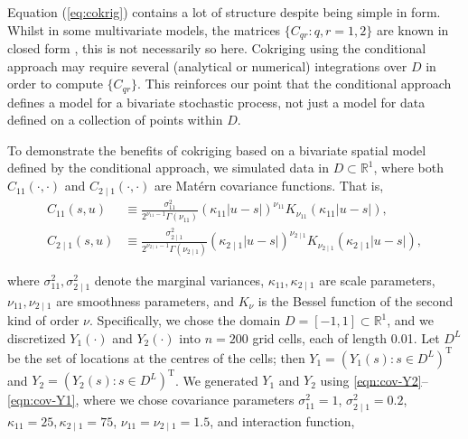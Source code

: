 \documentclass[lineno]{biometrika}
\def\T{{ \mathrm{\scriptscriptstyle T} }}
\newcommand{\Cmat} {C}
\newcommand{\svec} {s}
\newcommand{\h}{h}
\newcommand{\Yvec}{Y}
\begin{document}
Equation (\ref{eq:cokrig}) contains a lot of structure despite being simple in form. Whilst in some multivariate models, the matrices $\{\Cmat_{qr}: q,r = 1,2\}$ are known in closed form \citep{GentonKleiber2015}, this is not necessarily so here. Cokriging using the conditional approach may require several (analytical or numerical) integrations over $D$ in order to compute $\{\Cmat_{qr}\}$. This reinforces our point that the conditional approach defines a model for a bivariate stochastic process, not just a model for data defined on a collection of points within $D$. 

To demonstrate the benefits of cokriging based on a bivariate spatial model defined by the conditional approach, we simulated data in $D \subset \mathbb{R}^1$, where both $C_{11}(\cdot,\cdot)$ and $C_{2\mid 1}(\cdot,\cdot)$ are Mat{\'e}rn covariance functions. That is,
\begin{align}\label{eq:Matern1}
C_{11}(s,u) &\equiv \frac{\sigma^2_{11}}{2^{\nu_{11}-1}\Gamma(\nu_{11})}(\kappa_{11} |u-s|)^{\nu_{11}}K_{\nu_{11}}(\kappa_{11} |u-s|),\\
C_{2\mid 1}(s,u) &\equiv \frac{\sigma^2_{2\mid 1}}{2^{\nu_{2\mid 1}-1}\Gamma(\nu_{2\mid 1})}(\kappa_{2\mid 1} |u-s|)^{\nu_{2\mid 1}}K_{\nu_{2\mid 1}}(\kappa_{2\mid 1} |u-s|), \label{eq:Matern2}
\end{align}

\normalsize
\noindent  where $\sigma^2_{11}, \sigma^2_{2\mid 1}$ denote the marginal variances, $\kappa_{11}, \kappa_{2\mid 1}$ are scale parameters, $\nu_{11}, \nu_{2\mid 1}$ are smoothness parameters, and $K_\nu$ is the Bessel function of the second kind of order $\nu$. Specifically, we chose the domain $D = [-1,1] \subset \mathbb{R}^1$, and we discretized $Y_1(\cdot)$ and $Y_2(\cdot)$ into $n=200$ grid cells, each of length 0.01. Let $D^L$ be the set of locations at the centres of the cells; then $\Yvec_1 = (Y_1(s): s \in D^L)^\T$ and $\Yvec_2 = (Y_2(s): s \in D^L)^\T$. We generated $\Yvec_1$ and $\Yvec_2$ using \eqref{eqn:cov-Y2}--\eqref{eqn:cov-Y1}, where we chose covariance parameters $\sigma^2_{11} = 1$, $\sigma^2_{2\mid 1} = 0.2$, $\kappa_{11} = 25, \kappa_{2\mid 1} = 75$, $\nu_{11} = \nu_{2\mid 1} = 1.5$, and interaction function,
\end{document}
